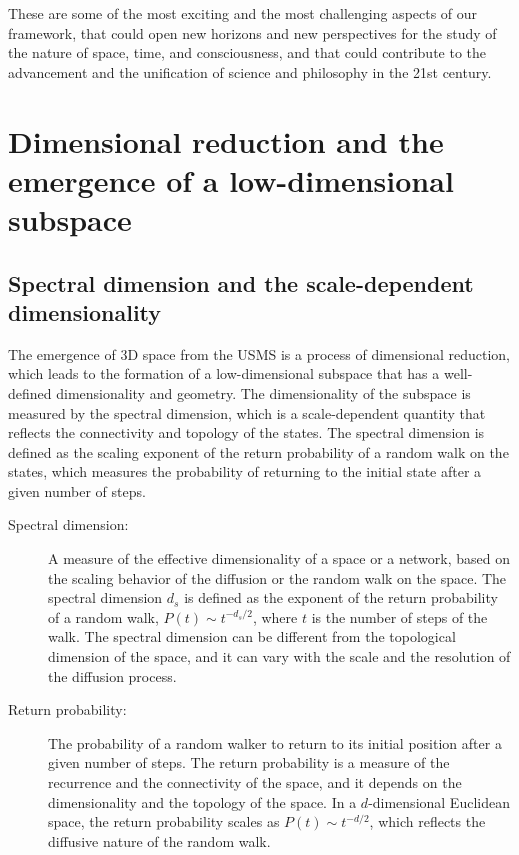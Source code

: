 These are some of the most exciting and the most challenging aspects of our framework, that could open new horizons and new perspectives for the study of the nature of space, time, and consciousness, and that could contribute to the advancement and the unification of science and philosophy in the 21st century.

\section{Dimensional reduction and the emergence of a low-dimensional subspace}
\subsection{Spectral dimension and the scale-dependent dimensionality}
The emergence of 3D space from the USMS is a process of dimensional reduction, which leads to the formation of a low-dimensional subspace that has a well-defined dimensionality and geometry. The dimensionality of the subspace is measured by the spectral dimension, which is a scale-dependent quantity that reflects the connectivity and topology of the states. The spectral dimension is defined as the scaling exponent of the return probability of a random walk on the states, which measures the probability of returning to the initial state after a given number of steps.

\begin{tcolorbox}[colback=blue!5!white,colframe=blue!75!black,title=New terms]
    \begin{description}
        \item[Spectral dimension:] A measure of the effective dimensionality of a space or a network, based on the scaling behavior of the diffusion or the random walk on the space. The spectral dimension $d_s$ is defined as the exponent of the return probability of a random walk, $P(t) \sim t^{-d_s/2}$, where $t$ is the number of steps of the walk. The spectral dimension can be different from the topological dimension of the space, and it can vary with the scale and the resolution of the diffusion process.
        \item[Return probability:] The probability of a random walker to return to its initial position after a given number of steps. The return probability is a measure of the recurrence and the connectivity of the space, and it depends on the dimensionality and the topology of the space. In a $d$-dimensional Euclidean space, the return probability scales as $P(t) \sim t^{-d/2}$, which reflects the diffusive nature of the random walk.
    \end{description}
\end{tcolorbox}

